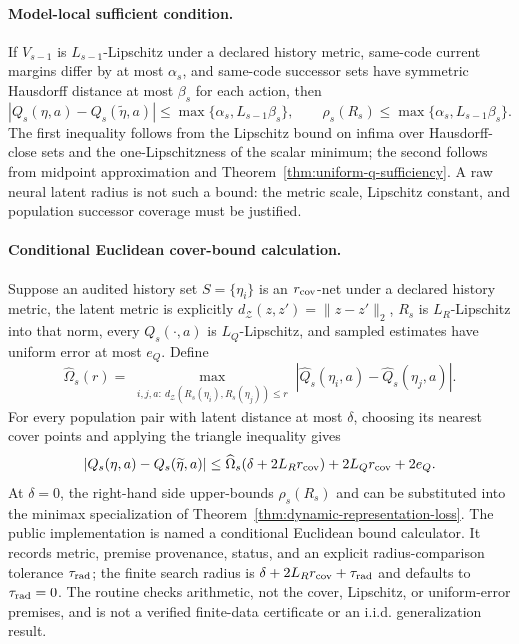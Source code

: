\paragraph{Model-local sufficient condition.}
If $V_{s-1}$ is $L_{s-1}$-Lipschitz under a declared history metric, same-code current margins
differ by at most $\alpha_s$, and same-code successor sets have symmetric Hausdorff distance at
most $\beta_s$ for each action, then
\[
 |Q_s(\eta,a)-Q_s(\widetilde\eta,a)|
 \leq\max\{\alpha_s,L_{s-1}\beta_s\},
 \qquad
 \rho_s(R_s)\leq\max\{\alpha_s,L_{s-1}\beta_s\}.
\]
The first inequality follows from the Lipschitz bound on infima over Hausdorff-close sets and the
one-Lipschitzness of the scalar minimum; the second follows from midpoint approximation and
Theorem~\ref{thm:uniform-q-sufficiency}.  A raw neural latent radius is not such a bound:
the metric scale, Lipschitz constant, and population successor coverage must be justified.

\paragraph{Conditional Euclidean cover-bound calculation.}
Suppose an audited history set $S=\{\eta_i\}$ is an $r_{\rm cov}$-net under a declared history
metric, the latent metric is explicitly $d_{\mathcal Z}(z,z')=\lVert z-z'\rVert_2$, $R_s$ is
$L_R$-Lipschitz into that norm, every $Q_s(\cdot,a)$ is $L_Q$-Lipschitz, and sampled estimates
have uniform error at most $e_Q$.  Define
\[
 \widehat\Omega_s(r)=
 \max_{\substack{i,j,a:\ d_{\mathcal Z}(R_s(\eta_i),R_s(\eta_j))\leq r}}
 |\widehat Q_s(\eta_i,a)-\widehat Q_s(\eta_j,a)|.
\]
For every population pair with latent distance at most $\delta$, choosing its nearest cover points
and applying the triangle inequality gives
\begin{equation}
 |Q_s(\eta,a)-Q_s(\widetilde\eta,a)|
 \leq\widehat\Omega_s(\delta+2L_Rr_{\rm cov})
 +2L_Qr_{\rm cov}+2e_Q.
 \label{eq:cover-q-certificate}
\end{equation}
At $\delta=0$, the right-hand side upper-bounds $\rho_s(R_s)$ and can be substituted into the
minimax specialization of Theorem~\ref{thm:dynamic-representation-loss}.  The public implementation
is named a conditional Euclidean bound calculator.  It records metric, premise provenance, status,
and an explicit radius-comparison tolerance $\tau_{\rm rad}$; the finite search radius is
$\delta+2L_Rr_{\rm cov}+\tau_{\rm rad}$ and defaults to $\tau_{\rm rad}=0$.  The routine checks
arithmetic, not the cover, Lipschitz, or uniform-error premises, and is not a verified finite-data
certificate or an i.i.d. generalization result.

